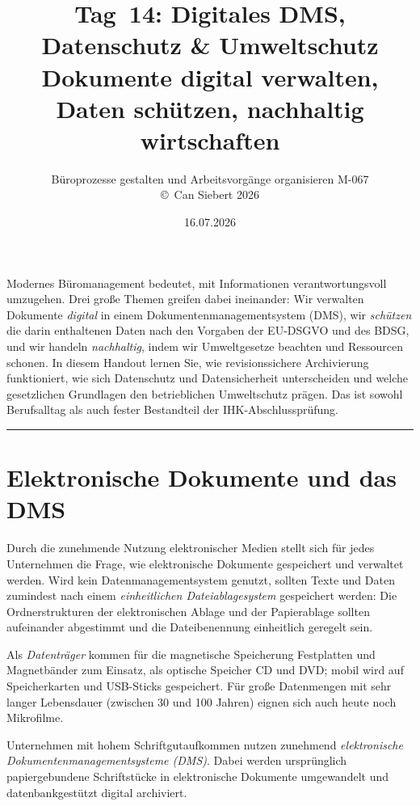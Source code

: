 \documentclass[11pt, a4paper]{article}
\title{\vspace*{-1.5cm}\Huge\bfseries\color{bfwPrimaryDark}Tag~14: Digitales DMS, Datenschutz \& Umweltschutz\\[0.4em]
  \large\color{bfwInkSoft}\textnormal{Dokumente digital verwalten, Daten schützen, nachhaltig wirtschaften}}
\author{\textsf{Büroprozesse gestalten und Arbeitsvorgänge organisieren \textperiodcentered{} M-067}\\
\textsf{\small\copyright\ Can Siebert\,\textperiodcentered\,2026}}
\date{16.07.2026}
\begin{document}
\maketitle
\thispagestyle{empty}

\vspace{1em}
\begin{merksatz}[title={\bfseries Worum geht es heute?}]
Modernes Büromanagement bedeutet, mit Informationen verantwortungsvoll umzugehen.
Drei große Themen greifen dabei ineinander: Wir verwalten Dokumente \emph{digital}
in einem Dokumentenmanagementsystem (DMS), wir \emph{schützen} die darin enthaltenen
Daten nach den Vorgaben der EU-DSGVO und des BDSG, und wir handeln \emph{nachhaltig},
indem wir Umweltgesetze beachten und Ressourcen schonen. In diesem Handout lernen Sie,
wie revisionssichere Archivierung funktioniert, wie sich Datenschutz und Datensicherheit
unterscheiden und welche gesetzlichen Grundlagen den betrieblichen Umweltschutz prägen.
Das ist sowohl Berufsalltag als auch fester Bestandteil der IHK-Abschlussprüfung.
\end{merksatz}

\tableofcontents
\vspace{1em}
\hrule
\vspace{1em}

\section{Elektronische Dokumente und das DMS}

Durch die zunehmende Nutzung elektronischer Medien stellt sich für jedes Unternehmen
die Frage, wie elektronische Dokumente gespeichert und verwaltet werden. Wird kein
Datenmanagementsystem genutzt, sollten Texte und Daten zumindest nach einem
\emph{einheitlichen Dateiablagesystem} gespeichert werden: Die Ordnerstrukturen der
elektronischen Ablage und der Papierablage sollten aufeinander abgestimmt und die
Dateibenennung einheitlich geregelt sein.

Als \emph{Datenträger} kommen für die magnetische Speicherung Festplatten und
Magnetbänder zum Einsatz, als optische Speicher CD und DVD; mobil wird auf Speicherkarten
und USB-Sticks gespeichert. Für große Datenmengen mit sehr langer Lebensdauer (zwischen
30 und 100 Jahren) eignen sich auch heute noch Mikrofilme.

Unternehmen mit hohem Schriftgutaufkommen nutzen zunehmend \emph{elektronische
Dokumentenmanagementsysteme (DMS)}. Dabei werden ursprünglich papiergebundene
Schriftstücke in elektronische Dokumente umgewandelt und datenbankgestützt digital
archiviert.
\end{document}
